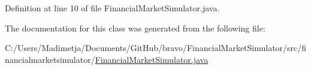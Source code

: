 Definition at line 10 of file Financial\+Market\+Simulator.\+java.



The documentation for this class was generated from the following file\+:\begin{DoxyCompactItemize}
\item 
C\+:/\+Users/\+Madimetja/\+Documents/\+Git\+Hub/bravo/\+Financial\+Market\+Simulator/src/financialmarketsimulator/\hyperlink{_financial_market_simulator_8java}{Financial\+Market\+Simulator.\+java}\end{DoxyCompactItemize}
